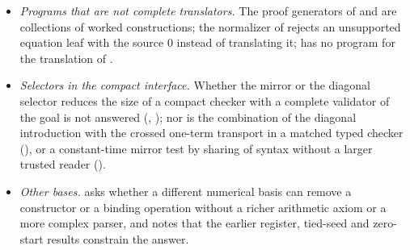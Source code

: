\begin{itemize}
  observes that a
 formalization of $\mathsf M$ cannot start by restricting the transport
 rule of the kernel and using its substitution theorem
 (\cref{guard:rem:substwording}).
\item \emph{Programs that are not complete translators.}  The proof
 generators of  and  are collections
 of worked constructions; the normalizer of  rejects an
 unsupported equation leaf with the source $0$ instead of translating it;
  has no program for the translation of .
\item \emph{Selectors in the compact interface.}  Whether the mirror or the
 diagonal selector reduces the size of a compact checker with a complete
 validator of the goal is not answered (,
 ); nor is the combination of the diagonal introduction
 with the crossed one-term transport in a matched typed checker
 (), or a constant-time mirror test by sharing of
 syntax without a larger trusted reader ().
\item \emph{Other bases.}   asks whether a different
 numerical basis can remove a constructor or a binding operation without a
 richer arithmetic axiom or a more complex parser, and notes that the
 earlier register, tied-seed and zero-start results constrain the answer.
\end{itemize}
